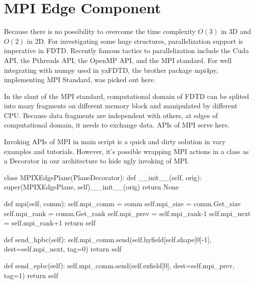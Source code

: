 \section{MPI Edge Component}
Because there is no possibility to overcome the time complexity $O(3)$ in 3D and $O(2)$ in 2D. For investigating some
huge structures, parallelization support is imperative in FDTD. Recently famous tactics to parallelization include the
Cuda API, the Pthreads API, the OpenMP API, and the MPI standard. For well integrating with numpy used in yaFDTD, the
brother package mpi4py, implementing MPI Standard, was picked out here.

In the slant of the MPI standard, computational domain of FDTD can be splited into many fragments on different memory
block and manipulated by different CPU. Because data fragments are independent with others, at edges of computational
domain, it needs to exchange data. APIs of MPI serve here.

Invoking APIs of MPI in main script is a quick and dirty solution in vary examples and tutorials. However, it's possible
wrapping MPI actions in a class as a Decorator in our architecture to hide ugly invoking of MPI. 
\begin{code}
    class MPIXEdgePlane(PlaneDecorator):
        def __init__(self, orig):
            super(MPIXEdgePlane, self).__init__(orig)
            return None

        def mpi(self, comm):
            self.mpi_comm = comm
            self.mpi_size = comm.Get_size
            self.mpi_rank = comm.Get_rank
            self.mpi_prev = self.mpi_rank-1
            self.mpi_next = self.mpi_rank+1
            return self

        def send_hpbc(self):
            self.mpi_comm.send(self.hyfield[self.shape[0]-1], dest=self.mpi_next, tag=0)
            return self

        def send_epbc(self):
            self.mpi_comm.send(self.ezfield[0], dest=self.mpi_prev, tag=1)
            return self
\end{code}

